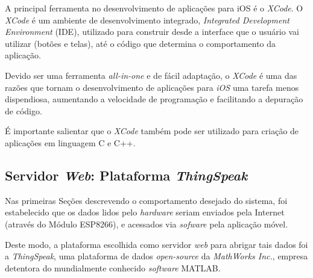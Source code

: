 \documentclass[
    12pt,               %
    openright,          %
    oneside,
    a4paper,            
    english,            %
    brazil              %
    ]{abntex2}
\begin{document}
A principal ferramenta no desenvolvimento de aplicações para iOS é o \textit{XCode}. O \textit{XCode} é um ambiente de desenvolvimento integrado, \textit{Integrated Development Environment} (IDE), utilizado para construir desde a interface que o usuário vai utilizar (botões e telas), até o código que determina o comportamento da aplicação.


Devido ser uma ferramenta \textit{all-in-one} e de fácil adaptação, o \textit{XCode} é uma das razões que tornam o desenvolvimento de aplicações para \textit{iOS} uma tarefa menos dispendiosa, aumentando a velocidade de programação e facilitando a depuração de código. 

É importante salientar que o \textit{XCode} também pode ser utilizado para criação de aplicações em linguagem C e C++.

\subsection{Servidor \textit{Web}: Plataforma \textit{ThingSpeak}}

Nas primeiras Seções descrevendo o comportamento desejado do sistema, foi estabelecido que os dados lidos pelo \textit{hardware} seriam enviados pela Internet (através do Módulo ESP8266), e acessados via \textit{sofware} pela aplicação móvel.

Deste modo, a plataforma escolhida como servidor \textit{web} para abrigar tais dados foi a \textit{ThingSpeak}, uma plataforma de dados \textit{open-source} da \textit{MathWorks Inc.}, empresa detentora do mundialmente conhecido \textit{software} MATLAB.

\end{document}
